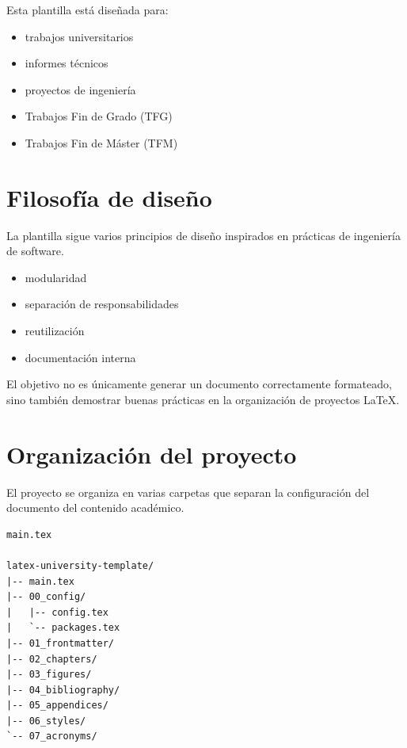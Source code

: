 Esta plantilla está diseñada para:

\begin{itemize}
\item trabajos universitarios
\item informes técnicos
\item proyectos de ingeniería
\item Trabajos Fin de Grado (TFG)
\item Trabajos Fin de Máster (TFM)
\end{itemize}




\section{Filosofía de diseño}

La plantilla sigue varios principios de diseño inspirados
en prácticas de ingeniería de software.

\begin{itemize}
\item modularidad
\item separación de responsabilidades
\item reutilización
\item documentación interna
\end{itemize}



\begin{notebox}
El objetivo no es únicamente generar un documento
correctamente formateado, sino también demostrar
buenas prácticas en la organización de proyectos
\LaTeX.
\end{notebox}




\section{Organización del proyecto}

El proyecto se organiza en varias carpetas que separan
la configuración del documento del contenido académico.



\begin{lstlisting}[caption={Estructura general del proyecto},label={code:estructura}]
main.tex

latex-university-template/
|-- main.tex
|-- 00_config/
|   |-- config.tex
|   `-- packages.tex
|-- 01_frontmatter/
|-- 02_chapters/
|-- 03_figures/
|-- 04_bibliography/
|-- 05_appendices/
|-- 06_styles/
`-- 07_acronyms/
\end{lstlisting}

